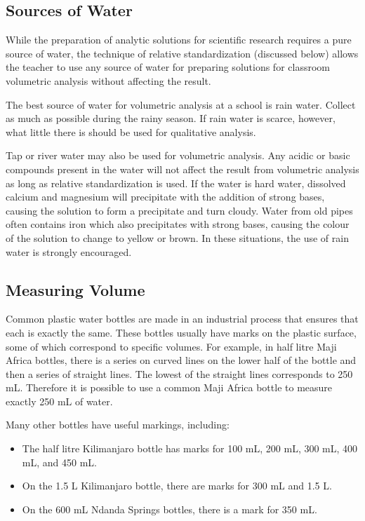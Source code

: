 \subsection{Sources of Water}
While the preparation of analytic solutions for scientific research requires a pure source of water, the technique of relative standardization (discussed below) allows the teacher to use any source of water for preparing solutions for classroom volumetric analysis without affecting the result.

The best source of water for volumetric analysis at a school is rain water. Collect as much as possible during the rainy season. If rain water is scarce, however, what little there is should be used for qualitative analysis.

Tap or river water may also be used for volumetric analysis. Any acidic or basic compounds present in the water will not affect the result from volumetric analysis as long as relative standardization is used. If the water is hard water, dissolved calcium and magnesium will precipitate with the addition of strong bases, causing the solution to form a precipitate and turn cloudy. Water from old pipes often contains iron which also precipitates with strong bases, causing the colour of the solution to change to yellow or brown. In these situations, the use of rain water is strongly encouraged.

\subsection{Measuring Volume}
Common plastic water bottles are made in an industrial process that ensures that each is exactly the same. These bottles usually have marks on the plastic surface, some of which correspond to specific volumes. For example, in half litre Maji Africa bottles, there is a series on curved lines on the lower half of the bottle and then a series of straight lines. The lowest of the straight lines corresponds to 250 mL. Therefore it is possible to use a common Maji Africa bottle to measure exactly 250 mL of water. %

Many other bottles have useful markings, including:
\begin{itemize}
\item{The half litre Kilimanjaro bottle has marks for 100 mL, 200 mL, 300 mL, 400 mL, and 450 mL.} %
\item{On the 1.5 L Kilimanjaro bottle, there are marks for 300 mL and 1.5 L.} %
\item{On the 600 mL Ndanda Springs bottles, there is a mark for 350 mL.}
\end{itemize}

